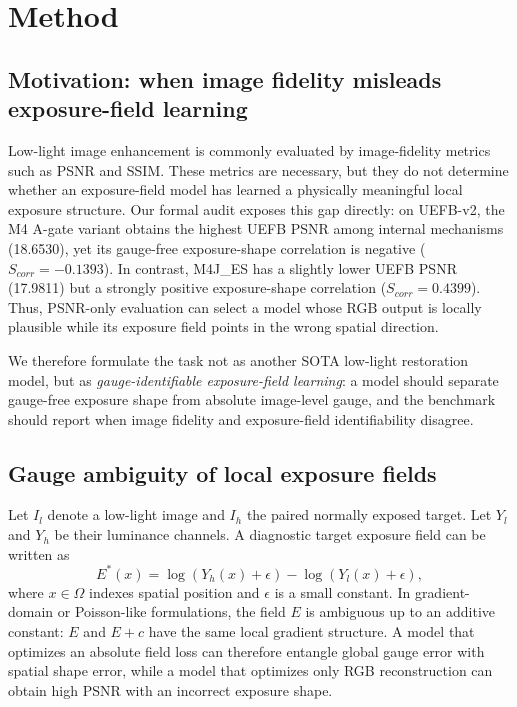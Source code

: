 \section{Method}
\label{sec:method}

\subsection{Motivation: when image fidelity misleads exposure-field learning}

Low-light image enhancement is commonly evaluated by image-fidelity metrics such as PSNR and SSIM. These metrics are necessary, but they do not determine whether an exposure-field model has learned a physically meaningful local exposure structure. Our formal audit exposes this gap directly: on UEFB-v2, the M4 A-gate variant obtains the highest UEFB PSNR among internal mechanisms (18.6530), yet its gauge-free exposure-shape correlation is negative ($S_{corr}=-0.1393$). In contrast, M4J\_ES has a slightly lower UEFB PSNR (17.9811) but a strongly positive exposure-shape correlation ($S_{corr}=0.4399$). Thus, PSNR-only evaluation can select a model whose RGB output is locally plausible while its exposure field points in the wrong spatial direction.

We therefore formulate the task not as another SOTA low-light restoration model, but as \emph{gauge-identifiable exposure-field learning}: a model should separate gauge-free exposure shape from absolute image-level gauge, and the benchmark should report when image fidelity and exposure-field identifiability disagree.

\subsection{Gauge ambiguity of local exposure fields}

Let $I_l$ denote a low-light image and $I_h$ the paired normally exposed target. Let $Y_l$ and $Y_h$ be their luminance channels. A diagnostic target exposure field can be written as
\begin{equation}
E^*(x) = \log(Y_h(x)+\epsilon) - \log(Y_l(x)+\epsilon),
\end{equation}
where $x \in \Omega$ indexes spatial position and $\epsilon$ is a small constant. In gradient-domain or Poisson-like formulations, the field $E$ is ambiguous up to an additive constant: $E$ and $E+c$ have the same local gradient structure. A model that optimizes an absolute field loss can therefore entangle global gauge error with spatial shape error, while a model that optimizes only RGB reconstruction can obtain high PSNR with an incorrect exposure shape.


